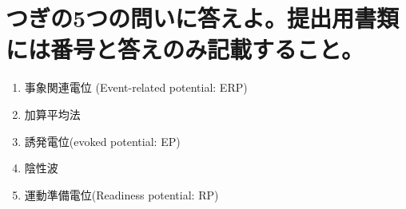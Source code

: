 \documentclass[titlepage,a4paper]{jsarticle}
\begin{document}
\section{つぎの5つの問いに答えよ。提出用書類には番号と答えのみ記載すること。}%
\begin{enumerate}
      \item 事象関連電位 (Event-related potential: ERP)
      \item 加算平均法
      \item 誘発電位(evoked potential: EP)
      \item 陰性波
      \item 運動準備電位(Readiness potential: RP)
\end{enumerate}
\end{document}

